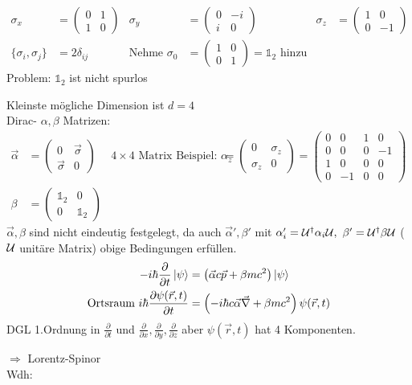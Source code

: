 	\begin{align*}
		\sigma_x &=
		\begin{pmatrix}
		0 & 1 \\
		1 & 0
		\end{pmatrix}&
		\sigma_y &=
		\begin{pmatrix}
		0 & -i \\
		i & 0
		\end{pmatrix}&
		\sigma_z &= 
		\begin{pmatrix}
		1 & 0 \\
		0 & -1
		\end{pmatrix} \\
		\{\sigma_i, \sigma_j\} &= 2 \delta_{ij} 
		&\text{Nehme } \sigma_0 &=
		\begin{pmatrix}
		1 & 0 \\
		0 & 1
		\end{pmatrix}
		= \mathds{1}_2 \text{ hinzu} 
	\end{align*}
Problem: $\mathds{1}_2$ ist nicht spurlos

Kleinste mögliche Dimension ist $d = 4$
\\
Dirac- $\alpha,\beta$ Matrizen:
	\begin{align*}
		\vec{\alpha} &=
		\begin{pmatrix}
		0 & \vec{\sigma} \\
		\vec{\sigma} & 0
		\end{pmatrix} 
		& 4 \times 4 \text{ Matrix Beispiel: }
		\alpha_z &=
		\begin{pmatrix}
		0 & \sigma_z \\
		\sigma_z & 0
		\end{pmatrix}
		=
		\begin{pmatrix}
		0 & 0 & 1 & 0 \\
		0 & 0 & 0 & -1 \\
		1 & 0 & 0 & 0\\
		0 & -1 & 0 & 0
		\end{pmatrix} \\
		\beta &=
		\begin{pmatrix}
		\mathds{1}_2 & 0 \\
		0 & \mathds{1}_2
		\end{pmatrix}
	\end{align*}
$\vec{\alpha}, \beta$ sind nicht eindeutig festgelegt, da auch $\vec{\alpha}', \beta'$ mit 
$\alpha_i' = \mathcal{U}^\dagger \alpha_i \mathcal{U},~ \beta' = \mathcal{U}^\dagger \beta \mathcal{U}$ ($\mathcal{U}$ unitäre Matrix) obige Bedingungen erfüllen.
	\begin{align*}
		-i\hbar \frac{\partial}{\partial t} \ket{\psi}
		&= \left(\vec{\alpha} c \vec{p} + \beta m c^2\right) \ket{\psi} \\
		\text{Ortsraum } i\hbar \frac{\partial \psi (\vec{r}, t)}{\partial t}
		&= \left(-i\hbar c \vec{\alpha} \vec{\nabla} + \beta m c^2\right) \psi (\vec{r}, t)
	\end{align*}
DGL 1.Ordnung in $\frac{\partial}{\partial t}$ und $\frac{\partial}{\partial x}, \frac{\partial}{\partial y}, \frac{\partial}{\partial z}$ aber $\psi (\vec{r}, t)$ hat 4 Komponenten.

$\Rightarrow$ Lorentz-Spinor
\\
Wdh: 